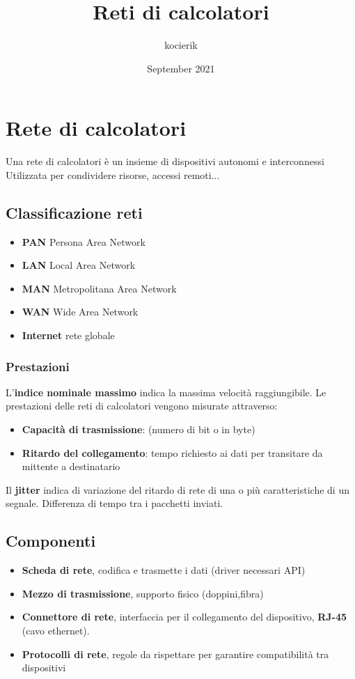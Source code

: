 \documentclass{article}
\title{Reti di calcolatori}
\author{kocierik }
\date{September 2021}
\begin{document}
\tableofcontents

\maketitle

\section{Rete di calcolatori}
Una rete di calcolatori è un insieme di dispositivi autonomi e interconnessi
Utilizzata per condividere risorse, accessi remoti...

\subsection{Classificazione reti}
\begin{itemize}
    \item \textbf{PAN} Persona Area Network
    \item \textbf{LAN} Local Area Network
    \item \textbf{MAN} Metropolitana Area Network
    \item \textbf{WAN} Wide Area Network
    \item \textbf{Internet} rete globale
\end{itemize}

\subsubsection{Prestazioni}
L'\textbf{indice nominale massimo} indica la massima velocità raggiungibile.
Le prestazioni delle reti di calcolatori vengono misurate attraverso:
\begin{itemize}
    \item \textbf{Capacità di trasmissione}: (numero di bit o in byte)
    \item \textbf{Ritardo del collegamento}: tempo richiesto ai dati per transitare da mittente a destinatario
\end{itemize}
Il \textbf{jitter} indica di variazione del ritardo di rete di una o più caratteristiche di un segnale. Differenza di tempo tra i pacchetti inviati.

\subsection{Componenti}
\begin{itemize}
    \item \textbf{Scheda di rete}, codifica e trasmette i dati (driver necessari API)
    \item \textbf{Mezzo di trasmissione}, supporto fisico (doppini,fibra)
    \item \textbf{Connettore di rete}, interfaccia per il collegamento del dispositivo, \textbf{RJ-45} (cavo ethernet).
    \item \textbf{Protocolli di rete}, regole da rispettare per garantire compatibilità tra dispositivi
\end{itemize}
\end{document}
